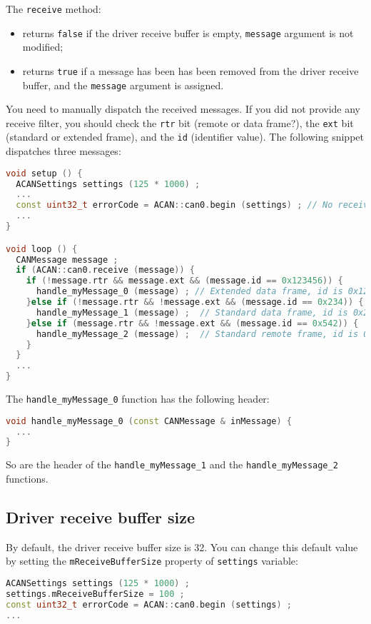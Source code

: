 \documentclass[10pt, a4paper, obeyspaces, openany]{extarticle}
\newcommand \subsectionLabel[2]{\subsection{#1}\label{subsec:#2}}
\begin{document}
The \texttt{receive} method:
\begin{itemize}
  \item returns \texttt{false} if the driver receive buffer is empty, \texttt{message} argument is not modified;
  \item returns \texttt{true} if a message has been has been removed from the driver receive buffer, and the \texttt{message} argument is assigned.
\end{itemize}

You need to manually dispatch the received messages. If you did not provide any receive filter, you should check the \texttt{rtr} bit (remote or data frame?), the \texttt{ext} bit (standard or extended frame), and the \texttt{id} (identifier value). The following snippet dispatches three messages:
{ \small\begin{lstlisting}[language=c++]
void setup () {
  ACANSettings settings (125 * 1000) ;
  ...
  const uint32_t errorCode = ACAN::can0.begin (settings) ; // No receive filter
  ...
}

void loop () {
  CANMessage message ;
  if (ACAN::can0.receive (message)) {
    if (!message.rtr && message.ext && (message.id == 0x123456)) {
      handle_myMessage_0 (message) ; // Extended data frame, id is 0x123456
    }else if (!message.rtr && !message.ext && (message.id == 0x234)) {
      handle_myMessage_1 (message) ;  // Standard data frame, id is 0x234
    }else if (message.rtr && !message.ext && (message.id == 0x542)) {
      handle_myMessage_2 (message) ;  // Standard remote frame, id is 0x542
    }
  }
  ...
}
\end{lstlisting}}

The \texttt{handle\_myMessage\_0} function has the following header:

{ \small\begin{lstlisting}[language=c++]
void handle_myMessage_0 (const CANMessage & inMessage) {
  ...
}
\end{lstlisting}}

So are the header of the \texttt{handle\_myMessage\_1} and the \texttt{handle\_myMessage\_2} functions.




\subsectionLabel{Driver receive buffer size}{driverReceiveBufferSize}

By default, the driver receive buffer size is 32.  You can change this default value by setting the \texttt{mReceiveBufferSize} property of \texttt{settings} variable:

{ \small\begin{lstlisting}[language=c++]
ACANSettings settings (125 * 1000) ;
settings.mReceiveBufferSize = 100 ;
const uint32_t errorCode = ACAN::can0.begin (settings) ;
...
\end{lstlisting}}
\end{document}
